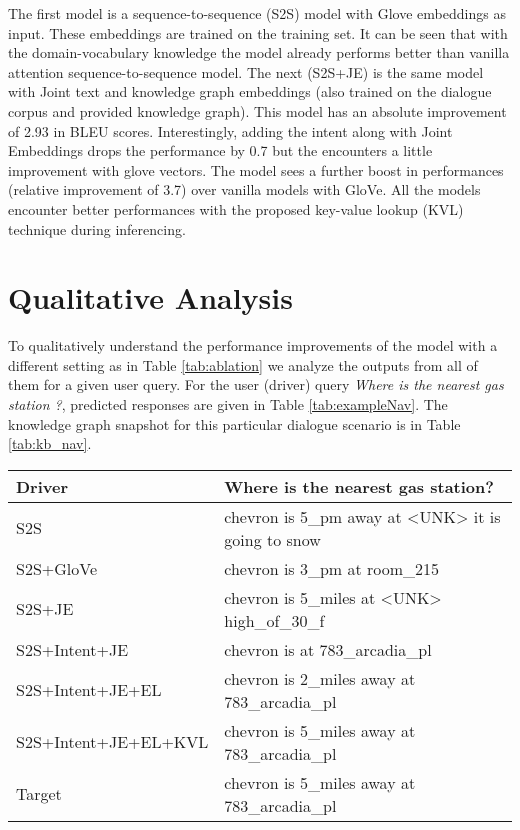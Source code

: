 \documentclass[runningheads]{llncs}
\begin{document}
The first model is a sequence-to-sequence (S2S) model with Glove \cite{pennington2014} embeddings as input. These embeddings are trained on the training set. It can be seen that with the domain-vocabulary knowledge the model already performs better than vanilla attention sequence-to-sequence model. The next (S2S+JE) is the same model with Joint text and knowledge graph embeddings (also trained on the dialogue corpus and provided knowledge graph). This model has an absolute improvement of 2.93 in BLEU scores. Interestingly, adding the intent along with Joint Embeddings drops the performance by 0.7 but the encounters a little improvement with glove vectors. The model sees a further boost in performances (relative improvement of 3.7) over vanilla models with GloVe. All the models encounter better performances with the proposed key-value lookup (KVL) technique during inferencing.

\section{Qualitative Analysis}
 
To qualitatively understand the performance improvements of the model with a different setting as in Table \ref{tab:ablation} we analyze the outputs from all of them for a given user query. For the user (driver) query \textit{Where is the nearest gas station ?}, predicted responses are given in Table \ref{tab:exampleNav}. The knowledge graph snapshot for this particular dialogue scenario is in Table \ref{tab:kb_nav}.
 
\begin{table*}
\centering
\caption{Example of generated responses on the Navigation domain explaining the improvement process through the model stages.}
\begin{tabular}{l|l}

\hline
    \textbf{Driver} & Where is the nearest gas station? \\
\hline
    S2S & chevron is 5\_pm away at <UNK> it is going to snow \\
    S2S+GloVe &  chevron is 3\_pm at room\_215 \\
    S2S+JE & chevron is 5\_miles at <UNK> high\_of\_30\_f \\
    S2S+Intent+JE & chevron is at 783\_arcadia\_pl\\
    S2S+Intent+JE+EL & chevron is 2\_miles away at 783\_arcadia\_pl \\ 
    S2S+Intent+JE+EL+KVL & chevron is 5\_miles away at 783\_arcadia\_pl \\
\hline
    Target & chevron is 5\_miles away at 783\_arcadia\_pl \\
\hline


\end{tabular}
 \vspace{0.1cm}

 \label{tab:exampleNav}
\end{table*}
\end{document}
